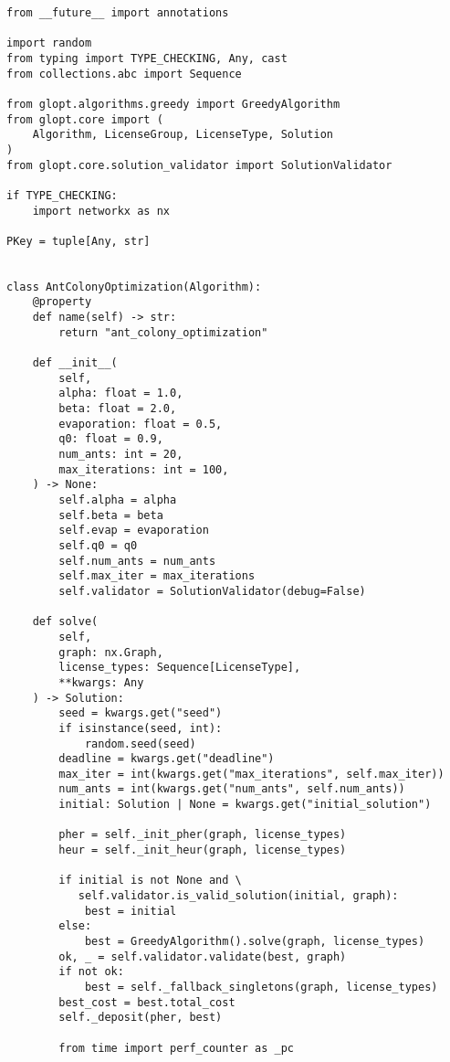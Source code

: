 \begin{verbatim}
from __future__ import annotations

import random
from typing import TYPE_CHECKING, Any, cast
from collections.abc import Sequence

from glopt.algorithms.greedy import GreedyAlgorithm
from glopt.core import (
    Algorithm, LicenseGroup, LicenseType, Solution
)
from glopt.core.solution_validator import SolutionValidator

if TYPE_CHECKING:
    import networkx as nx

PKey = tuple[Any, str]


class AntColonyOptimization(Algorithm):
    @property
    def name(self) -> str:
        return "ant_colony_optimization"

    def __init__(
        self,
        alpha: float = 1.0,
        beta: float = 2.0,
        evaporation: float = 0.5,
        q0: float = 0.9,
        num_ants: int = 20,
        max_iterations: int = 100,
    ) -> None:
        self.alpha = alpha
        self.beta = beta
        self.evap = evaporation
        self.q0 = q0
        self.num_ants = num_ants
        self.max_iter = max_iterations
        self.validator = SolutionValidator(debug=False)

    def solve(
        self,
        graph: nx.Graph,
        license_types: Sequence[LicenseType],
        **kwargs: Any
    ) -> Solution:
        seed = kwargs.get("seed")
        if isinstance(seed, int):
            random.seed(seed)
        deadline = kwargs.get("deadline")
        max_iter = int(kwargs.get("max_iterations", self.max_iter))
        num_ants = int(kwargs.get("num_ants", self.num_ants))
        initial: Solution | None = kwargs.get("initial_solution")

        pher = self._init_pher(graph, license_types)
        heur = self._init_heur(graph, license_types)

        if initial is not None and \
           self.validator.is_valid_solution(initial, graph):
            best = initial
        else:
            best = GreedyAlgorithm().solve(graph, license_types)
        ok, _ = self.validator.validate(best, graph)
        if not ok:
            best = self._fallback_singletons(graph, license_types)
        best_cost = best.total_cost
        self._deposit(pher, best)

        from time import perf_counter as _pc


\end{verbatim}
